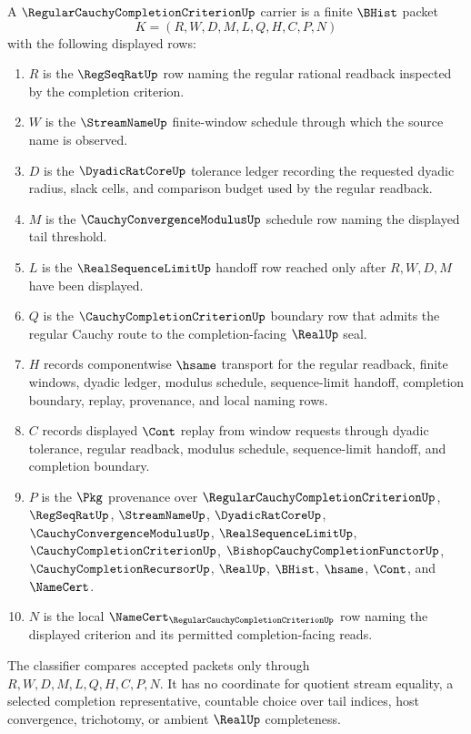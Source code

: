 \begin{theorem}
\label{thm:regular-cauchy-completion-criterion-carrier}
A $\RegularCauchyCompletionCriterionUp$ carrier is a finite $\BHist$ packet
$$
K=(R,W,D,M,L,Q,H,C,P,N)
$$
with the following displayed rows:
\begin{enumerate}
\item $R$ is the $\RegSeqRatUp$ row naming the regular rational readback inspected by the completion criterion.
\item $W$ is the $\StreamNameUp$ finite-window schedule through which the source name is observed.
\item $D$ is the $\DyadicRatCoreUp$ tolerance ledger recording the requested dyadic radius, slack cells, and comparison budget used by the regular readback.
\item $M$ is the $\CauchyConvergenceModulusUp$ schedule row naming the displayed tail threshold.
\item $L$ is the $\RealSequenceLimitUp$ handoff row reached only after $R,W,D,M$ have been displayed.
\item $Q$ is the $\CauchyCompletionCriterionUp$ boundary row that admits the regular Cauchy route to the completion-facing $\RealUp$ seal.
\item $H$ records componentwise $\hsame$ transport for the regular readback, finite windows, dyadic ledger, modulus schedule, sequence-limit handoff, completion boundary, replay, provenance, and local naming rows.
\item $C$ records displayed $\Cont$ replay from window requests through dyadic tolerance, regular readback, modulus schedule, sequence-limit handoff, and completion boundary.
\item $P$ is the $\Pkg$ provenance over $\RegularCauchyCompletionCriterionUp$, $\RegSeqRatUp$, $\StreamNameUp$, $\DyadicRatCoreUp$, $\CauchyConvergenceModulusUp$, $\RealSequenceLimitUp$, $\CauchyCompletionCriterionUp$, $\BishopCauchyCompletionFunctorUp$, $\CauchyCompletionRecursorUp$, $\RealUp$, $\BHist$, $\hsame$, $\Cont$, and $\NameCert$.
\item $N$ is the local $\NameCert_{\RegularCauchyCompletionCriterionUp}$ row naming the displayed criterion and its permitted completion-facing reads.
\end{enumerate}
The classifier compares accepted packets only through $R,W,D,M,L,Q,H,C,P,N$. It has no coordinate for quotient stream equality, a selected completion representative, countable choice over tail indices, host convergence, trichotomy, or ambient $\RealUp$ completeness.
\end{theorem}

